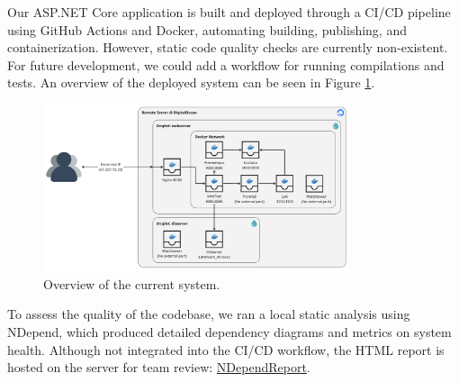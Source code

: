 \documentclass[12pt,a4paper,reqno]{report}
\begin{document}
Our ASP.NET Core application is built and deployed through a CI/CD pipeline using GitHub Actions and Docker, automating building, publishing, and containerization. However, static code quality checks are currently non-existent. For future development, we could add a workflow for running compilations and tests. An overview of the deployed system can be seen in Figure \ref{fig:SystemOverview}.

\begin{figure}[H]
    \centering
    \includegraphics[width=0.8\textwidth]{images/SystemOverview.png}
    \caption{Overview of the current system.}
    \label{fig:SystemOverview}
\end{figure}

To assess the quality of the codebase, we ran a local static analysis using NDepend, which produced detailed dependency diagrams and metrics on system health. Although not integrated into the CI/CD workflow, the HTML report is hosted on the server for team review: \href{http://67.207.72.20:8081/NDependReport.html#Main}{NDependReport}.
\end{document}
